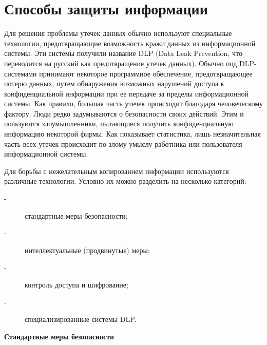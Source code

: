 \section{Способы защиты информации}

Для решения проблемы утечек данных обычно используют специальные технологии, предотвращающие возможность кражи данных из информационной системы. Эти системы получили название DLP (Data Leak Prevention, что переводится на русский как предотвращение утечек данных). Обычно под DLP-системами принимают некоторое программное обеспечение, предотвращающее потерю данных, путем обнаружения возможных нарушений доступа к конфиденциальной информации при ее передаче за пределы информационной системы. Как правило, большая часть утечек происходит благодаря человеческому фактору. Люди редко задумываются о безопасности своих действий. Этим и пользуются злоумышленники, пытающиеся получить конфиденциальную информацию некоторой фирмы. Как показывает статистика, лишь незначительная часть всех утечек происходит по злому умыслу работника или пользователя информационной системы.

Для борьбы с нежелательным копированием информации используются различные технологии. Условно их можно разделить на несколько категорий:

\begin{description}
	\item[-]
		стандартные меры безопасности;
	\item[-]
		интеллектуальные (продвинутые) меры;
	\item[-]
		контроль доступа и шифрование;
	\item[-]
		специализированные системы DLP.
\end{description}

\textbf{Стандартные меры безопасности}

